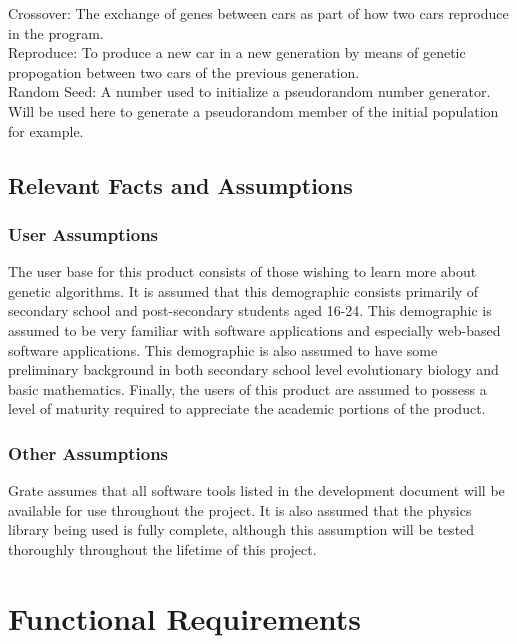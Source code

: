 \documentclass[12pt, titlepage]{article}
\begin{document}
Crossover: The exchange of genes between cars as part of how two cars reproduce in the program.\\

Reproduce: To produce a new car in a new generation by means of genetic propogation between two cars of the previous generation.\\

Random Seed: A number used to initialize a pseudorandom number generator. Will be used here to generate a pseudorandom member of the initial population for example.\\

\subsection{Relevant Facts and Assumptions}

\subsubsection{User Assumptions}

The user base for this product consists of those wishing to learn more about 
genetic algorithms. It is assumed that this demographic consists primarily of 
secondary school and post-secondary students aged 16-24. This demographic is 
assumed to be very familiar with software applications and especially web-based 
software applications. This demographic is also assumed to have some preliminary 
background in both secondary school level evolutionary biology and basic 
mathematics. Finally, the users of this product are assumed to possess a level 
of maturity required to appreciate the academic portions of the product.

\subsubsection{Other Assumptions}

Grate assumes that all software tools listed in the development document will be 
available for use throughout the project. It is also assumed that the physics 
library being used is fully complete, although this assumption will be tested 
thoroughly throughout the lifetime of this project.

\newpage

\section{Functional Requirements}
\end{document}
